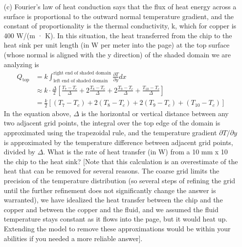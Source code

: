 \documentclass[12pt,letterpaper]{hmcpset}
\begin{document}
	
	\begin{problem}[2 (cont.)]
		\begin{enumerate}
			\item[(c)] Fourier's law of heat conduction says that the flux of heat energy across a surface
			is proportional to the outward normal temperature gradient, and the constant of
			proportionality is the thermal conductivity, k, which for copper is 400 W/(m · K). In this
			situation, the heat transferred from the chip to the heat sink per unit length (in W per
			meter into the page) at the top surface (whose normal is aligned with the y direction) of
			the shaded domain we are analyzing is
			\begin{displaymath}
			\begin{split}
			Q_{\text{top}} &= k \int_{\text{left end of shaded domain}}^{\text{right end of shaded domain}} \frac{\partial T}{\partial y}dx \\
			&\approx k \cdot \frac{\Delta}{2} \left[ \frac{T_7-T_c}{\Delta} + 2\frac{T_8-T_c}{\Delta} + 2\frac{T_9-T_c}{\Delta} + \frac{T_{10}-T_c}{\Delta}\right] \\
			&= \frac{k}{2} \left[(T_7-T_c) + 2(T_8-T_c) + 2(T_9-T_c) + (T_{10}-T_c) \right]
			\end{split}
			\end{displaymath}
			In the equation above, $\Delta$ is the horizontal or vertical distance between any two adjacent
			grid points, the integral over the top edge of the domain is approximated using the
			trapezoidal rule, and the temperature gradient $\partial T/\partial y$ is approximated by the temperature
			difference between adjacent grid points, divided by $\Delta$. What is the rate of heat transfer
			(in W) from a 10 mm x 10 the chip to the heat sink? [Note that this calculation is an
			overestimate of the heat that can be removed for several reasons. The coarse grid limits
			the precision of the temperature distribution (so several steps of refining the grid until
			the further refinement does not significantly change the answer is warranted), we have idealized the heat transfer between the chip and the copper and between the copper and
			the fluid, and we assumed the fluid temperature stays constant as it flows into the page,
			but it would heat up. Extending the model to remove these approximations would be
			within your abilities if you needed a more reliable answer].
		\end{enumerate}
	\end{problem}
	
\end{document}

